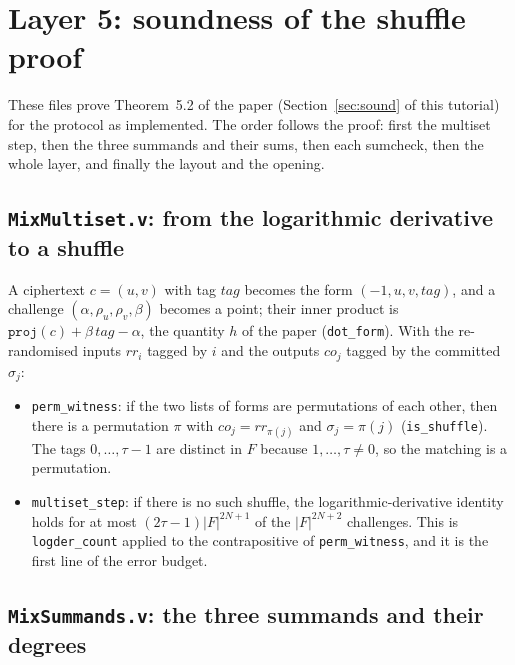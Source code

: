 \documentclass[11pt,a4paper]{article}
\theoremstyle{definition}
\theoremstyle{plain}
\begin{document}
\section{Layer 5: soundness of the shuffle proof}
\label{sec:fm-mix}

These files prove Theorem~5.2 of the paper (Section~\ref{sec:sound} of this tutorial) for the protocol
as implemented. The order follows the proof: first the multiset step, then the three summands and
their sums, then each sumcheck, then the whole layer, and finally the layout and the opening.

\subsection{\texttt{MixMultiset.v}: from the logarithmic derivative to a shuffle}

A ciphertext $c=(u,v)$ with tag $\mathit{tag}$ becomes the form $(-1,u,v,\mathit{tag})$, and a
challenge $(\alpha,\rho_u,\rho_v,\beta)$ becomes a point; their inner product is
$\mathtt{proj}(c)+\beta\,\mathit{tag}-\alpha$, the quantity $h$ of the paper (\texttt{dot\_form}).
With the re-randomised inputs $rr_i$ tagged by $i$ and the outputs $co_j$ tagged by the committed
$\sigma_j$:
\begin{itemize}[leftmargin=1.3em]
\item \texttt{perm\_witness}: if the two lists of forms are permutations of each other, then there is
  a permutation $\pi$ with $co_j=rr_{\pi(j)}$ and $\sigma_j=\pi(j)$ (\texttt{is\_shuffle}). The tags
  $0,\dots,\tau-1$ are distinct in $F$ because $1,\dots,\tau\ne0$, so the matching is a permutation.
\item \texttt{multiset\_step}: if there is no such shuffle, the logarithmic-derivative identity holds
  for at most $(2\tau-1)|F|^{2N+1}$ of the $|F|^{2N+2}$ challenges. This is \texttt{logder\_count}
  applied to the contrapositive of \texttt{perm\_witness}, and it is the first line of the error
  budget.
\end{itemize}

\subsection{\texttt{MixSummands.v}: the three summands and their degrees}
\end{document}
